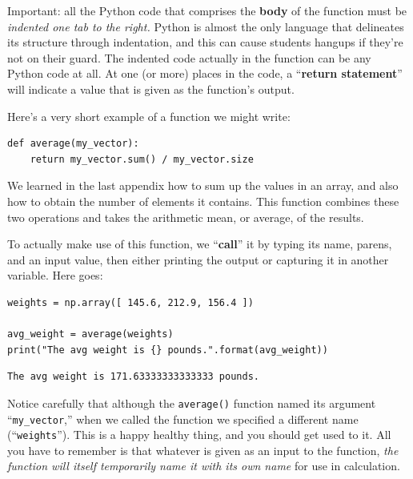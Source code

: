 
Important: all the Python code that comprises the \textbf{body} of the function
must be \textit{indented one tab to the right.} Python is almost the only
language that delineates its structure through indentation, and this can cause
students hangups if they're not on their guard. The indented code actually in
the function can be any Python code at all. At one (or more) places in the
code, a ``\textbf{return statement}'' will indicate a value that is given as
the function's output.

Here's a very short example of a function we might write:


\begin{Verbatim}[fontsize=\small,samepage=true,frame=single,framesep=3mm]
def average(my_vector):
    return my_vector.sum() / my_vector.size
\end{Verbatim}

We learned in the last appendix how to sum up the values in an array, and also
how to obtain the number of elements it contains. This function combines these
two operations and takes the arithmetic mean, or average, of the results.


To actually make use of this function, we ``\textbf{call}'' it by typing its
name, parens, and an input value, then either printing the output or capturing
it in another variable. Here goes:

\begin{Verbatim}[fontsize=\small,samepage=true,frame=single,framesep=3mm]
weights = np.array([ 145.6, 212.9, 156.4 ])

avg_weight = average(weights)
print("The avg weight is {} pounds.".format(avg_weight))
\end{Verbatim}
\vspace{-.2in}

\begin{Verbatim}[fontsize=\small,samepage=true,frame=leftline,framesep=5mm,framerule=1mm]
The avg weight is 171.63333333333333 pounds.
\end{Verbatim}

Notice carefully that although the \texttt{average()} function named its
argument ``\texttt{my\_vector},'' when we called the function we specified a
different name (``\texttt{weights}''). This is a happy healthy thing, and you
should get used to it. All you have to remember is that whatever is given as an
input to the function, \textit{the function will itself temporarily name it
with its own name} for use in calculation.


